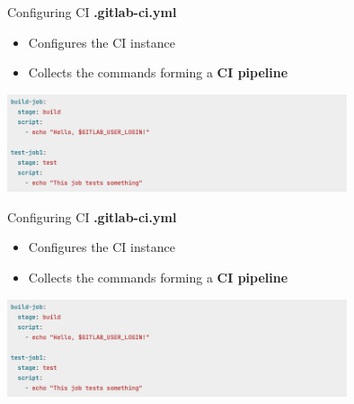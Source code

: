 \documentclass{setbeamer}
\begin{document}
\begin{frame}[c]{Configuring CI}
			\textbf{.gitlab-ci.yml}
            \begin{itemize}
            \item 
            Configures the CI instance
            \item
            Collects the commands forming a \textbf{CI pipeline}
            \end{itemize}
	\centering
    \includegraphics[width=10cm]{resources/ciyaml2.png}
\end{frame}

\begin{frame}[c]{Configuring CI}
			\textbf{.gitlab-ci.yml}
            \begin{itemize}
            \item 
            Configures the CI instance
            \item
            Collects the commands forming a \textbf{CI pipeline}
            \end{itemize}
	\centering
    \includegraphics[width=10cm]{resources/ciyaml2.png}
\end{frame}
\end{document}
